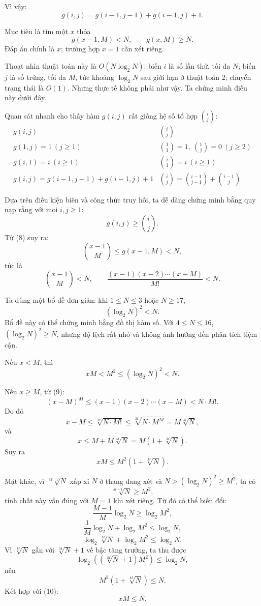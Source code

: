 \documentclass[11pt]{article}
\begin{document}
Vì vậy:
\[
  g(i,j)=g(i-1,j-1)+g(i-1,j)+1. \tag{7}
\]

Mục tiêu là tìm một $x$ thỏa
\[
  g(x-1,M)<N,\qquad g(x,M)\ge N. \tag{8}
\]
Đáp án chính là $x$; trường hợp $x=1$ cần xét riêng.

Thoạt nhìn thuật toán này là $O(N\log_2 N)$: biến $i$ là số lần thử, tối đa
$N$; biến $j$ là số trứng, tối đa $M$, tức khoảng $\log_2 N$ sau giới hạn ở
thuật toán 2; chuyển trạng thái là $O(1)$. Nhưng thực tế không phải như vậy.
Ta chứng minh điều này dưới đây.

Quan sát nhanh cho thấy hàm $g(i,j)$ rất giống hệ số tổ hợp $\binom{i}{j}$:
\[
\begin{array}{c|c}
g(i,j) & \binom{i}{j}\\
\hline
g(1,j)=1\ (j\ge 1) &
\binom{1}{1}=1,\ \binom{1}{j}=0\ (j\ge 2)\\
g(i,1)=i\ (i\ge 1) &
\binom{i}{1}=i\ (i\ge 1)\\
g(i,j)=g(i-1,j-1)+g(i-1,j)+1 &
\binom{i}{j}=\binom{i-1}{j-1}+\binom{i-1}{j}
\end{array}
\]

Dựa trên điều kiện biên và công thức truy hồi, ta dễ dàng chứng minh bằng quy
nạp rằng với mọi $i,j\ge 1$:
\[
  g(i,j)\ge \binom{i}{j}.
\]
Từ (8) suy ra:
\[
  \binom{x-1}{M}\le g(x-1,M)<N,
\]
tức là
\[
  \binom{x-1}{M}<N,\qquad
  \frac{(x-1)(x-2)\cdots(x-M)}{M!}<N. \tag{9}
\]

Ta dùng một bổ đề đơn giản: khi $1\le N\le 3$ hoặc $N\ge 17$,
\[
  (\log_2 N)^2<N.
\]
Bổ đề này có thể chứng minh bằng đồ thị hàm số. Với $4\le N\le 16$,
$(\log_2 N)^2\ge N$, nhưng độ lệch rất nhỏ và không ảnh hưởng đến phân tích
tiệm cận.

Nếu $x<M$, thì
\[
  xM<M^2\le (\log_2 N)^2<N.
\]

Nếu $x\ge M$, từ (9):
\[
  (x-M)^M\le (x-1)(x-2)\cdots(x-M)<N\cdot M!.
\]
Do đó
\[
  x-M\le \sqrt[M]{N\cdot M!}
       \le \sqrt[M]{N\cdot M^M}
       =M\sqrt[M]{N},
\]
và
\[
  x\le M+M\sqrt[M]{N}
    =M\left(1+\sqrt[M]{N}\right).
\]
Suy ra
\[
  xM\le M^2\left(1+\sqrt[M]{N}\right). \tag{10}
\]

Mặt khác, vì $\sqrt[M-1]{N}$ xấp xỉ $N$ ở thang đang xét và
$N>(\log_2 N)^2\ge M^2$, ta có
\[
  \sqrt[M-1]{N}\ge M^2,
\]
tính chất này vẫn đúng với $M=1$ khi xét riêng. Từ đó có thể biến đổi:
\[
  \frac{M-1}{M}\log_2 N\ge \log_2 M^2,
\]
\[
  \frac{1}{M}\log_2 N+\log_2 M^2\le \log_2 N,
\]
\[
  \log_2 \sqrt[M]{N}+\log_2 M^2\le \log_2 N.
\]
Vì $\sqrt[M]{N}$ gần với $\sqrt[M]{N}+1$ về bậc tăng trưởng, ta thu được
\[
  \log_2\left((\sqrt[M]{N}+1)M^2\right)\le \log_2 N,
\]
nên
\[
  M^2\left(1+\sqrt[M]{N}\right)\le N.
\]
Kết hợp với (10):
\[
  xM\le N.
\]
\end{document}
